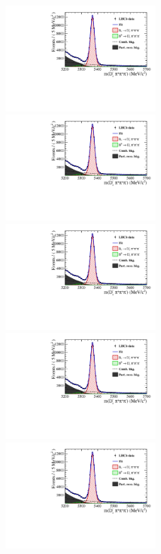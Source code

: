 \begin{figure}[h]
\includegraphics[height=!,width=0.5\textwidth]{figs/MassFit/norm_y11_phipi.pdf}
\includegraphics[height=!,width=0.5\textwidth]{figs/MassFit/norm_y11_KsK.pdf}
\includegraphics[height=!,width=0.5\textwidth]{figs/MassFit/norm_y11_KKpi_NR.pdf}
\includegraphics[height=!,width=0.5\textwidth]{figs/MassFit/norm_y11_pipipi.pdf}
\includegraphics[height=!,width=0.5\textwidth]{figs/MassFit/norm_y12_phipi.pdf}

\end{figure}
